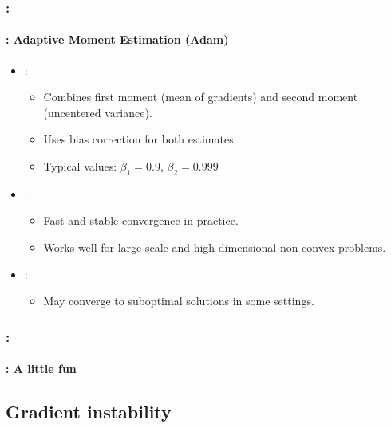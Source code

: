 \documentclass[xcolor=table]{beamer}
\begin{document}
\begin{frame}
	\frametitle{\insertshortsubtitle: \insertsection}
	\framesubtitle{\insertsubsection: Adaptive Moment Estimation (Adam)}
	
	\begin{itemize}
		\item {}: 
		\begin{itemize}
			\item Combines first moment (mean of gradients) and second moment (uncentered variance).
			\item Uses bias correction for both estimates.
			\item Typical values: $\beta_1 = 0.9$, $\beta_2 = 0.999$
		\end{itemize}
		
		\item {}: 
		\begin{itemize}
			\item Fast and stable convergence in practice.
			\item Works well for large-scale and high-dimensional non-convex problems.
		\end{itemize}
		
		\item {}: 
		\begin{itemize}
			\item May converge to suboptimal solutions in some settings.
		\end{itemize}
	\end{itemize}
	
\end{frame}

\begin{frame}
	\frametitle{\insertshortsubtitle: \insertsection}
	\framesubtitle{\insertsubsection: A little fun}
	
	
\end{frame}

\subsection{Gradient instability}
\end{document}

